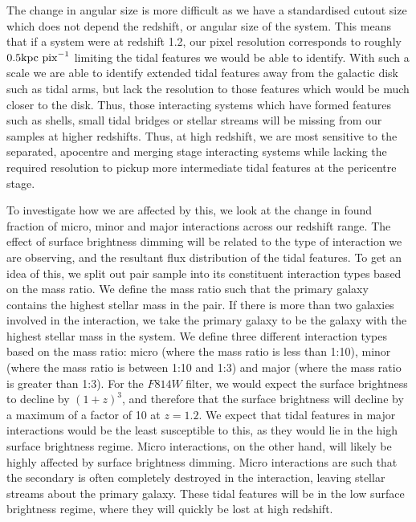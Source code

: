 The change in angular size is more difficult as we have a standardised cutout size which does not depend the redshift, or angular size of the system. This means that if a system were at redshift 1.2, our pixel resolution corresponds to roughly $0.5\rm{kpc~pix}^{-1}$ limiting the tidal features we would be able to identify. With such a scale we are able to identify extended tidal features away from the galactic disk such as tidal arms, but lack the resolution to those features which would be much closer to the disk. Thus, those interacting systems which have formed features such as shells, small tidal bridges or stellar streams will be missing from our samples at higher redshifts. Thus, at high redshift, we are most sensitive to the separated, apocentre and merging stage interacting systems while lacking the required resolution to pickup more intermediate tidal features at the pericentre stage.

To investigate how we are affected by this, we look at the change in found fraction of micro, minor and major interactions across our redshift range. The effect of surface brightness dimming will be related to the type of interaction we are observing, and the resultant flux distribution of the tidal features. To get an idea of this, we split out pair sample into its constituent interaction types based on the mass ratio. We define the mass ratio such that the primary galaxy contains the highest stellar mass in the pair. If there is more than two galaxies involved in the interaction, we take the primary galaxy to be the galaxy with the highest stellar mass in the system. We define three different interaction types based on the mass ratio: micro (where the mass ratio is less than 1:10), minor (where the mass ratio is between 1:10 and 1:3) and major (where the mass ratio is greater than 1:3). For the $F814W$ filter, we would expect the surface brightness to decline by $(1+z)^{3}$, and therefore that the surface brightness will decline by a maximum of a factor of 10 at $z=1.2$. We expect that tidal features in major interactions would be the least susceptible to this, as they would lie in the high surface brightness regime. Micro interactions, on the other hand, will likely be highly affected by surface brightness dimming. Micro interactions are such that the secondary is often completely destroyed in the interaction, leaving stellar streams about the primary galaxy. These tidal features will be in the low surface brightness regime, where they will quickly be lost at high redshift.

